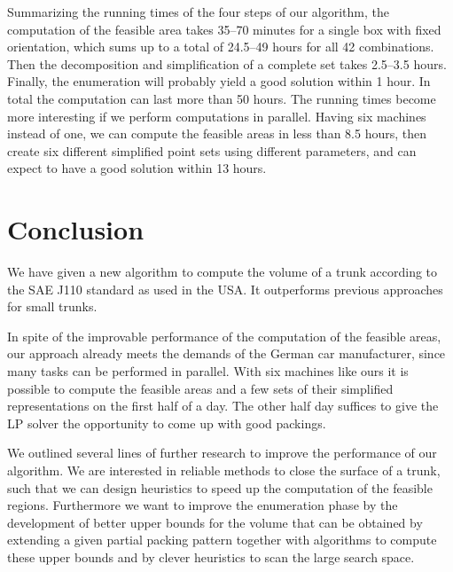 \documentclass{article}
\newcounter{algo}
\begin{document}
Summarizing the running times of the four steps of our algorithm, the
computation of the feasible area takes 35--70 minutes for a single box
with fixed orientation, which sums up to a total of 24.5--49 hours for
all 42 combinations. Then the decomposition and simplification of a
complete set takes 2.5--3.5 hours. Finally, the enumeration will
probably yield a good solution within 1 hour. In total the computation
can last more than 50 hours. The running times become more interesting
if we perform computations in parallel. Having six machines instead of
one, we can compute the feasible areas in less than 8.5 hours, then
create six different simplified point sets using different parameters,
and can expect to have a good solution within 13 hours.

\section{Conclusion}
\label{sec:conclusion}

We have given a new algorithm to compute the volume of a trunk
according to the SAE J110 standard as used in the USA. It outperforms
previous approaches for small trunks.

In spite of the improvable performance of the computation of the
feasible areas, our approach already meets the demands of the German
car manufacturer, since many tasks can be performed in parallel. With
six machines like ours it is possible to compute the feasible areas
and a few sets of their simplified representations on the first half
of a day. The other half day suffices to give the LP solver the
opportunity to come up with good packings.

We outlined several lines of further research to improve the
performance of our algorithm. We are interested in reliable methods to
close the surface of a trunk, such that we can design heuristics to
speed up the computation of the feasible regions. Furthermore we want
to improve the enumeration phase by the development of better upper
bounds for the volume that can be obtained by extending a given
partial packing pattern together with algorithms to compute these
upper bounds and by clever heuristics to scan the large search space.




\end{document}
